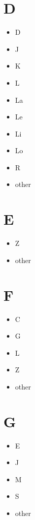 \documentclass[
]{book}
\providecommand{\tightlist}{%
  \setlength{\itemsep}{0pt}\setlength{\parskip}{0pt}}
\begin{document}
\hypertarget{d}{%
\section{D}\label{d}}

\begin{itemize}
\tightlist
\item
  D
\item
  J
\item
  K
\item
  L
\item
  La
\item
  Le
\item
  Li
\item
  Lo
\item
  R
\item
  other
\end{itemize}

\hypertarget{e}{%
\section{E}\label{e}}

\begin{itemize}
\tightlist
\item
  Z
\item
  other
\end{itemize}

\hypertarget{f}{%
\section{F}\label{f}}

\begin{itemize}
\tightlist
\item
  C
\item
  G
\item
  L
\item
  Z
\item
  other
\end{itemize}

\hypertarget{g}{%
\section{G}\label{g}}

\begin{itemize}
\tightlist
\item
  E
\item
  J
\item
  M
\item
  S
\item
  other
\end{itemize}
\end{document}

